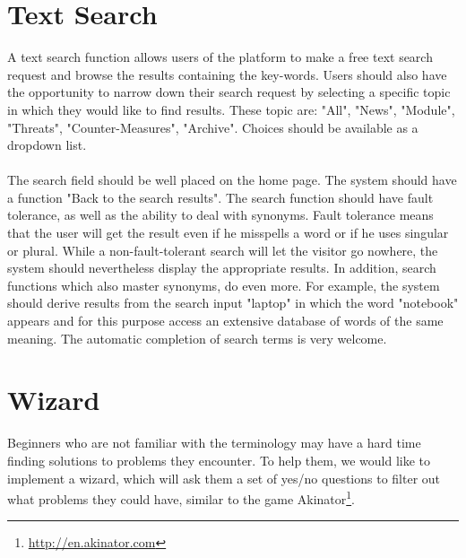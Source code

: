 \section{Text Search}
\label{search_function}
A text search function allows users of the platform to make a free text search request and browse the results containing the key-words. 
Users should also have the opportunity to narrow down their search request by selecting a specific topic in which they would like to find results. 
These topic are: "All", "News", "Module", "Threats", "Counter-Measures", "Archive". 
Choices should be available as a dropdown list.
\\\\
The search field should be well placed on the home page. 
The system should have a function "Back to the search results". 
The search function should have fault tolerance, as well as the ability to deal with synonyms. 
Fault tolerance means that the user will get the result even if he misspells a word or if he uses singular or plural. 
While a non-fault-tolerant search will let the visitor go nowhere, the system should nevertheless display the appropriate results.
In addition, search functions which also master synonyms, do even more. 
For example, the system should derive results from the search input "laptop" in which the word "notebook" appears and for this purpose access an extensive database of words of the same meaning. 
The automatic completion of search terms is very welcome.
 
\section{Wizard}
\label{wizard}
Beginners who are not familiar with the terminology may have a hard time finding solutions to problems they encounter. 
To help them, we would like to implement a wizard, which will ask them a set of yes/no questions to filter out what problems they could have, similar to the game Akinator\footnote{\url{http://en.akinator.com}}. 
 

